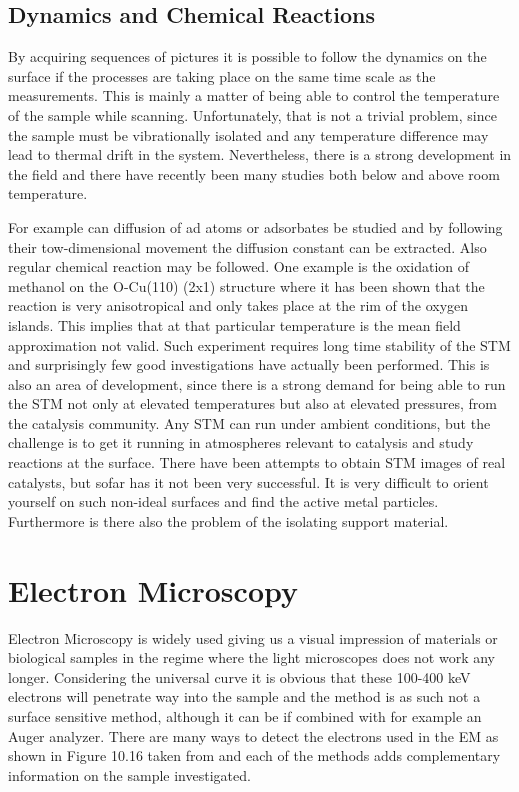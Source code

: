 \vspace*{11cm}


\vspace{1cm} 


\subsection{Dynamics and Chemical Reactions}
By acquiring sequences of pictures it is possible to follow the dynamics on the surface if the processes are taking place on the same time scale as the measurements. This is mainly a matter of being able to control the temperature of the sample while scanning. Unfortunately, that is not a trivial problem, since the sample must be vibrationally isolated and any temperature difference may lead to thermal drift in the system. Nevertheless, there is a strong development in the field and there have recently been many studies both below and above room temperature. 

 For example can diffusion of ad atoms or adsorbates  be studied and by following their tow-dimensional movement  the diffusion constant can be extracted. Also regular chemical reaction may be followed. One example is the oxidation of methanol on the O-Cu(110) (2x1) structure where it has been shown that the reaction is very anisotropical and only takes place at the rim of the oxygen islands. This implies that at that particular temperature is the  mean field approximation not valid. Such experiment requires long time stability of the STM and surprisingly few good investigations have actually been performed. This is also an area of development, since there is a strong demand for being able to run the STM not only at elevated temperatures but also at elevated pressures, from the catalysis community. Any STM can run under ambient conditions, but the challenge is to get it running in atmospheres relevant to catalysis and study reactions at the surface. There have been attempts to obtain STM images of real catalysts, but sofar has it not been very successful. It is very difficult to  orient yourself on such non-ideal surfaces and find the active metal particles. Furthermore is there also the problem of the isolating support material. 





\section{Electron Microscopy}
Electron Microscopy is widely used giving us a visual impression of materials or biological samples in the regime where the light microscopes does not work any longer. Considering  the universal curve  it is obvious that these 100-400 keV electrons will penetrate way into the sample and the method is as such not a surface sensitive method, although it can be if combined with for example an Auger analyzer. There are many ways to detect the electrons used in the EM as shown in Figure 10.16 taken from \cite{Niemantsverdriet} and each of the methods adds complementary information on the sample  investigated.  

